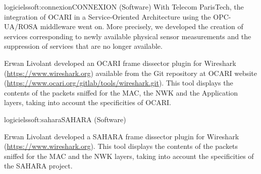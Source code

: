 \documentclass{ra2016}
\begin{document}
\begin{module}{logiciels}{soft:connexion}{CONNEXION (Software)}
With Telecom ParisTech, the integration of OCARI in a Service-Oriented Architecture using the OPC-UA/ROSA middleware went on. More precisely, we developed the creation of services corresponding to newly available physical sensor measurements and the suppression of services that are no longer available.

Erwan Livolant developed an OCARI frame dissector plugin for Wireshark (\url{https://www.wireshark.org}) available from the Git repository at OCARI website  (\url{https://www.ocari.org/gitlab/tools/wireshark.git}). This tool displays the contents of the packets sniffed for the MAC, the NWK and the Application layers, taking into account the specificities of OCARI.

\end{module}


\begin{module}{logiciels}{soft:sahara}{SAHARA (Software)} 

\begin{participants}
\end{participants}

Erwan Livolant developed a SAHARA frame dissector plugin for Wireshark (\url{https://www.wireshark.org}). This tool displays the contents of the packets sniffed for the MAC and the NWK layers, taking into account the specificities of the SAHARA project.

\end{module}
\end{document}
